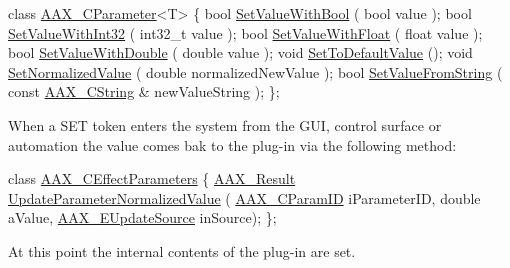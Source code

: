 \begin{DoxyCode}
\textcolor{keyword}{class }\hyperlink{a00033}{AAX\_CParameter}<T>
\{
    \textcolor{keywordtype}{bool} \hyperlink{a00033_a2089ea0d243087c562ce8b1bd89a495a}{SetValueWithBool} ( \textcolor{keywordtype}{bool} value );
    \textcolor{keywordtype}{bool} \hyperlink{a00033_aaf45f020a267f894429b4a75ddbe9c6c}{SetValueWithInt32} ( int32\_t value );
    \textcolor{keywordtype}{bool} \hyperlink{a00033_ab3f589671d20c826859b4398e96ee9bb}{SetValueWithFloat} ( \textcolor{keywordtype}{float} value );
    \textcolor{keywordtype}{bool} \hyperlink{a00033_a7551c4071f91cb48103b5a8dda8f73eb}{SetValueWithDouble} ( \textcolor{keywordtype}{double} value );
    \textcolor{keywordtype}{void} \hyperlink{a00033_a9ae87f0a8655c68ac7c59bec3f476c48}{SetToDefaultValue} ();
    \textcolor{keywordtype}{void} \hyperlink{a00033_ac4f8ae8c5ecb2cd04ebc3aa2523449f7}{SetNormalizedValue} ( \textcolor{keywordtype}{double} normalizedNewValue );
    \textcolor{keywordtype}{bool} \hyperlink{a00033_aa9194daefda8f6491849819fb25a73d2}{SetValueFromString} ( \textcolor{keyword}{const} \hyperlink{a00042}{AAX\_CString} & newValueString );
\};
\end{DoxyCode}


When a S\+E\+T token enters the system from the G\+U\+I, control surface or automation the value comes bak to the plug-\/in via the following method\+:


\begin{DoxyCode}
\textcolor{keyword}{class }\hyperlink{a00018}{AAX\_CEffectParameters}
\{
    \hyperlink{a00149_a4d8f69a697df7f70c3a8e9b8ee130d2f}{AAX\_Result} \hyperlink{a00018_a56a9f41a975b48f583655db7b43aae5a}{UpdateParameterNormalizedValue} ( 
      \hyperlink{a00149_a1440c756fe5cb158b78193b2fc1780d1}{AAX\_CParamID} iParameterID, \textcolor{keywordtype}{double} aValue, \hyperlink{a00206_a30be0398faf20c6b121239eb9399f3f7}{AAX\_EUpdateSource} inSource);
\};
\end{DoxyCode}


At this point the internal contents of the plug-\/in are set.



